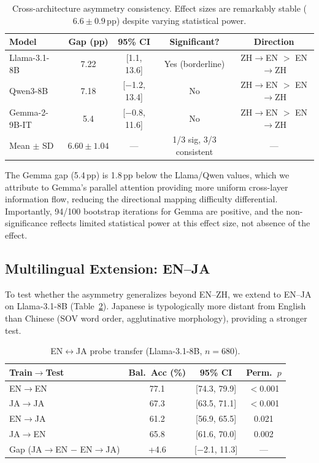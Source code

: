 \documentclass{article}
\begin{document}
\begin{table}[t]
\centering
\caption{Cross-architecture asymmetry consistency. Effect sizes are remarkably stable ($6.6 \pm 0.9$\,pp) despite varying statistical power.}
\label{tab:cross-arch}
\begin{tabular}{lcccc}
\toprule
Model & Gap (pp) & 95\% CI & Significant? & Direction \\
\midrule
Llama-3.1-8B & 7.22 & [1.1, 13.6] & Yes (borderline) & ZH$\to$EN $>$ EN$\to$ZH \\
Qwen3-8B & 7.18 & [$-$1.2, 13.4] & No & ZH$\to$EN $>$ EN$\to$ZH \\
Gemma-2-9B-IT & 5.4 & [$-$0.8, 11.6] & No & ZH$\to$EN $>$ EN$\to$ZH \\
\midrule
Mean $\pm$ SD & $6.60 \pm 1.04$ & --- & 1/3 sig, 3/3 consistent & --- \\
\bottomrule
\end{tabular}
\end{table}

The Gemma gap (5.4\,pp) is 1.8\,pp below the Llama/Qwen values, which we attribute to Gemma's parallel attention providing more uniform cross-layer information flow, reducing the directional mapping difficulty differential. Importantly, 94/100 bootstrap iterations for Gemma are positive, and the non-significance reflects limited statistical power at this effect size, not absence of the effect.

\subsection{Multilingual Extension: EN--JA}
\label{sec:multilingual}

To test whether the asymmetry generalizes beyond EN--ZH, we extend to EN--JA on Llama-3.1-8B (Table~\ref{tab:ja}). Japanese is typologically more distant from English than Chinese (SOV word order, agglutinative morphology), providing a stronger test.

\begin{table}[t]
\centering
\caption{EN$\leftrightarrow$JA probe transfer (Llama-3.1-8B, $n = 680$).}
\label{tab:ja}
\begin{tabular}{lccc}
\toprule
Train$\to$Test & Bal.\ Acc (\%) & 95\% CI & Perm.\ $p$ \\
\midrule
EN$\to$EN & 77.1 & [74.3, 79.9] & $<$0.001 \\
JA$\to$JA & 67.3 & [63.5, 71.1] & $<$0.001 \\
EN$\to$JA & 61.2 & [56.9, 65.5] & 0.021 \\
JA$\to$EN & 65.8 & [61.6, 70.0] & 0.002 \\
\midrule
Gap (JA$\to$EN $-$ EN$\to$JA) & +4.6 & [$-$2.1, 11.3] & --- \\
\bottomrule
\end{tabular}
\end{table}
\end{document}
